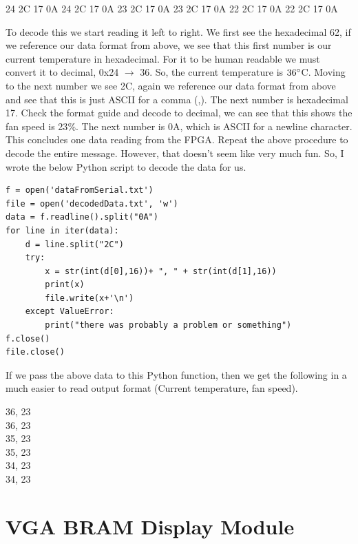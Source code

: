 \documentclass{article}
\begin{document}
\begin{center}
	24 2C 17 0A 24 2C 17 0A 23 2C 17 0A 23 2C 17 0A 22 2C 17 0A 22 2C 17 0A\\
\end{center}
To decode this we start reading it left to right. We first see the hexadecimal 62, if we reference our data format from above, we see that this first number is our current temperature in hexadecimal. For it to be human readable we must convert it to decimal, 0x24 $\rightarrow$ 36. So, the current temperature is $36\degree$C. Moving to the next number we see 2C, again we reference our data format from above and see that this is just ASCII for a comma (,). The next number is hexadecimal 17. Check the format guide and decode to decimal, we can see that this shows the fan speed is 23$\%$. The next number is 0A, which is ASCII for a newline character. This concludes one data reading from the FPGA. Repeat the above procedure to decode the entire message. However, that doesn't seem like very much fun. So, I wrote the below Python script to decode the data for us.

\begin{lstlisting}
f = open('dataFromSerial.txt')
file = open('decodedData.txt', 'w')
data = f.readline().split("0A")
for line in iter(data):
	d = line.split("2C")
	try:
		x = str(int(d[0],16))+ ", " + str(int(d[1],16))
		print(x)
		file.write(x+'\n')
	except ValueError:
		print("there was probably a problem or something")
f.close()
file.close()
\end{lstlisting}
If we pass the above data to this Python function, then we get the following in a much easier to read output format (Current temperature, fan speed).
\begin{center}
36, 23\\
36, 23\\
35, 23\\
35, 23\\
34, 23\\
34, 23\\
\end{center}

\section{VGA BRAM Display Module}
\end{document}
